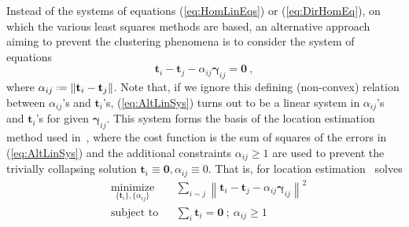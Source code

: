 \documentclass[10pt]{article}
\newcommand*{\defeq}{\mathrel{\vcenter{\baselineskip0.5ex \lineskiplimit0pt
                     \hbox{\scriptsize.}\hbox{\scriptsize.}}}
                     =}
\begin{document}
Instead of the systems of equations (\ref{eq:HomLinEqs}) or (\ref{eq:DirHomEq}), on which the various least squares methods are based, an alternative approach aiming to prevent the clustering phenomena is to consider the system of equations
\begin{equation}
\label{eq:AltLinSys}
\mathbf{t}_i-\mathbf{t}_j -\alpha_{ij}\mathbf{\gamma}_{ij} = \mathbf{0} \ ,
\end{equation}
where $\alpha_{ij} \defeq \|\mathbf{t}_i-\mathbf{t}_j\|$. Note that, if we ignore this defining (non-convex) relation between $\alpha_{ij}$'s and $\mathbf{t}_i$'s, (\ref{eq:AltLinSys}) turns out to be a linear system in $\alpha_{ij}$'s and $\mathbf{t}_i$'s for given $\mathbf{\gamma}_{ij}$. This system forms the basis of the location estimation method used in~\cite{TronVidalJournal}, where the cost function is the sum of squares of the errors in (\ref{eq:AltLinSys}) and the additional constraints $\alpha_{ij}\geq1$ are used to prevent the trivially collapsing solution $\mathbf{t}_i \equiv \mathbf{0}, \alpha_{ij}\equiv 0$. That is, for location estimation~\cite{TronVidalJournal} solves
\begin{equation}
\label{eq:CLS}
\begin{aligned}
&\underset{{\scriptstyle \{\mathbf{t}_i\}, \{\alpha_{ij}\}}}{\text{minimize}}
& & \sum_{i\sim j}  \left\| \mathbf{t}_i-\mathbf{t}_j - \alpha_{ij}\mathbf{\gamma}_{ij} \right\|^2 \\
& \text{subject to}
& & \sum_{i} \mathbf{t}_i = \mathbf{0} \ ; \ \alpha_{ij}\geq 1
\end{aligned}
\end{equation}
\end{document}
